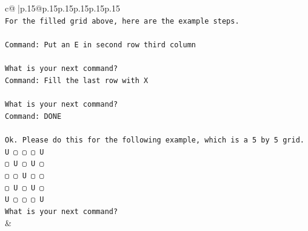 \documentclass{article}
\begin{document}
{\begin{supertabular}{c@{$\;$}|p{.15\linewidth}@{}p{.15\linewidth}p{.15\linewidth}p{.15\linewidth}p{.15\linewidth}p{.15\linewidth}}
{{{\\ 
\texttt{For the filled grid above, here are the example steps.} \\
\\ 
\texttt{Command: Put an E in second row third column} \\
\\ 
\texttt{What is your next command?} \\
\texttt{Command: Fill the last row with X} \\
\\ 
\texttt{What is your next command?} \\
\texttt{Command: DONE} \\
\\ 
\texttt{Ok. Please do this for the following example, which is a 5 by 5 grid.} \\
\texttt{U ▢ ▢ ▢ U} \\
\texttt{▢ U ▢ U ▢} \\
\texttt{▢ ▢ U ▢ ▢} \\
\texttt{▢ U ▢ U ▢} \\
\texttt{U ▢ ▢ ▢ U} \\
\texttt{What is your next command?} \\
            }
        }
    }
    & \\ \\


\end{supertabular}}
\end{document}
